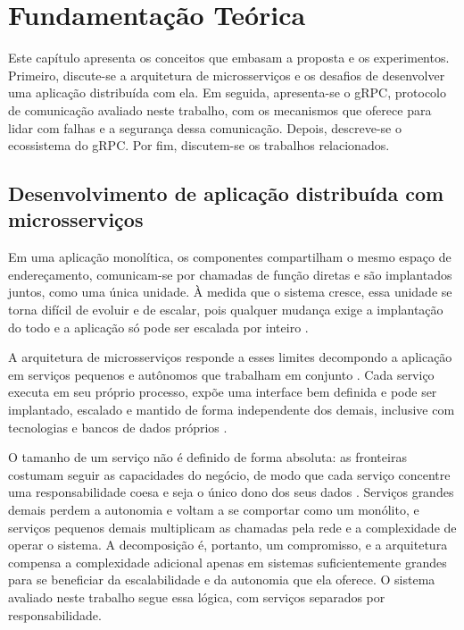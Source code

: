 \chapter{Fundamentação Teórica}\label{cap:fundamentacaoTeorica}

Este capítulo apresenta os conceitos que embasam a proposta e os experimentos. Primeiro, discute-se
a arquitetura de microsserviços e os desafios de desenvolver uma aplicação distribuída com ela. Em
seguida, apresenta-se o gRPC, protocolo de comunicação avaliado neste trabalho, com os mecanismos
que oferece para lidar com falhas e a segurança dessa comunicação. Depois, descreve-se o
ecossistema do gRPC. Por fim, discutem-se os trabalhos relacionados.

\section{Desenvolvimento de aplicação distribuída com microsserviços}

Em uma aplicação monolítica, os componentes compartilham o mesmo espaço de endereçamento,
comunicam-se por chamadas de função diretas e são implantados juntos, como uma única unidade. À
medida que o sistema cresce, essa unidade se torna difícil de evoluir e de escalar, pois qualquer
mudança exige a implantação do todo e a aplicação só pode ser escalada por inteiro
\cite{BuildingMicroservices:2015}.

A arquitetura de microsserviços responde a esses limites decompondo a aplicação em serviços
pequenos e autônomos que trabalham em conjunto \cite{BuildingMicroservices:2015}. Cada serviço
executa em seu próprio processo, expõe uma interface bem definida e pode ser implantado, escalado e
mantido de forma independente dos demais, inclusive com tecnologias e bancos de dados próprios
\cite{BuildingMicroservices:2015, MicroserviceArchitecture:2016}.

O tamanho de um serviço não é definido de forma absoluta: as fronteiras costumam seguir as
capacidades do negócio, de modo que cada serviço concentre uma responsabilidade coesa e seja o
único dono dos seus dados \cite{BuildingMicroservices:2015, MicroserviceArchitecture:2016}.
Serviços grandes demais perdem a autonomia e voltam a se comportar como um monólito, e serviços
pequenos demais multiplicam as chamadas pela rede e a complexidade de operar o sistema. A
decomposição é, portanto, um compromisso, e a arquitetura compensa a complexidade adicional apenas
em sistemas suficientemente grandes para se beneficiar da escalabilidade e da autonomia que ela
oferece. O sistema avaliado neste trabalho segue essa lógica, com serviços separados por responsabilidade.

